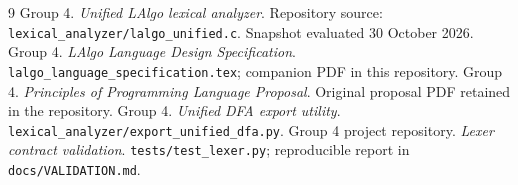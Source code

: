 \documentclass[11pt,a4paper]{article}
\newcommand{\code}[1]{\texttt{#1}}
\begin{document}
\begingroup\small
\renewcommand{\refname}{Project Sources}
\begin{thebibliography}{9}
 Group 4. \emph{Unified LAlgo lexical analyzer}. Repository source:
\code{lexical\_analyzer/}\allowbreak\code{lalgo\_unified.c}. Snapshot evaluated 30 October 2026.
 Group 4. \emph{LAlgo Language Design Specification}.
\code{lalgo\_language\_specification.tex}; companion PDF in this repository.
 Group 4. \emph{Principles of Programming Language Proposal}.
Original proposal PDF retained in the repository.
 Group 4. \emph{Unified DFA export utility}.
\code{lexical\_analyzer/export\_unified\_dfa.py}.
 Group 4 project repository. \emph{Lexer contract validation}.
\code{tests/test\_lexer.py}; reproducible report in \code{docs/VALIDATION.md}.
\end{thebibliography}
\endgroup
\end{document}
